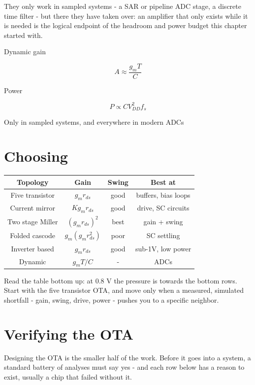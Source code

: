 They only work in sampled systems - a SAR or pipeline ADC stage, a
discrete time filter - but there they have taken over: an amplifier that
only exists while it is needed is the logical endpoint of the headroom
and power budget this chapter started with.

Dynamic gain

\[ A \approx \frac{g_m T}{C} \]

Power

\[ P \propto C V_{DD}^2 f_s \]

Only in sampled systems, and everywhere in modern ADCs

\section{Choosing}\label{choosing}

\begin{longtable}[]{@{}cccc@{}}
\toprule\noalign{}
Topology & Gain & Swing & Best at \\
\midrule\noalign{}
\endhead
\bottomrule\noalign{}
\endlastfoot
Five transistor & \(g_m r_{ds}\) & good & buffers, bias loops \\
Current mirror & \(K g_m r_{ds}\) & good & drive, SC circuits \\
Two stage Miller & \((g_m r_{ds})^2\) & best & gain + swing \\
Folded cascode & \(g_m (g_m r_{ds}^2)\) & poor & SC settling \\
Inverter based & \(g_m r_{ds}\) & good & sub-1V, low power \\
Dynamic & \(g_m T/C\) & - & ADCs \\
\end{longtable}

Read the table bottom up: at 0.8 V the pressure is towards the bottom
rows. Start with the five transistor OTA, and move only when a measured,
simulated shortfall - gain, swing, drive, power - pushes you to a
specific neighbor.

\section{Verifying the OTA}\label{verifying-the-ota}

Designing the OTA is the smaller half of the work. Before it goes into a
system, a standard battery of analyses must say yes - and each row below
has a reason to exist, usually a chip that failed without it.

